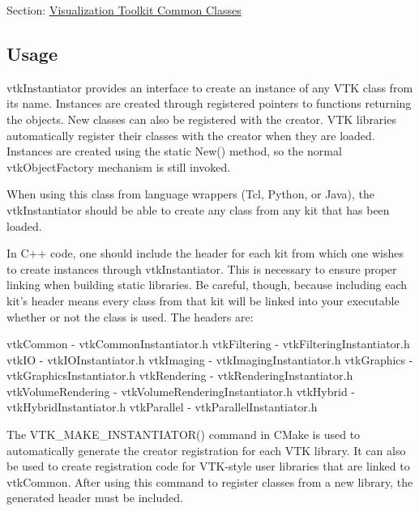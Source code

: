 Section\-: \hyperlink{sec_vtkcommon}{Visualization Toolkit Common Classes} \hypertarget{vtkwidgets_vtkxyplotwidget_Usage}{}\subsection{Usage}\label{vtkwidgets_vtkxyplotwidget_Usage}
vtk\-Instantiator provides an interface to create an instance of any V\-T\-K class from its name. Instances are created through registered pointers to functions returning the objects. New classes can also be registered with the creator. V\-T\-K libraries automatically register their classes with the creator when they are loaded. Instances are created using the static New() method, so the normal vtk\-Object\-Factory mechanism is still invoked.

When using this class from language wrappers (Tcl, Python, or Java), the vtk\-Instantiator should be able to create any class from any kit that has been loaded.

In C++ code, one should include the header for each kit from which one wishes to create instances through vtk\-Instantiator. This is necessary to ensure proper linking when building static libraries. Be careful, though, because including each kit's header means every class from that kit will be linked into your executable whether or not the class is used. The headers are\-:

vtk\-Common -\/ vtk\-Common\-Instantiator.\-h vtk\-Filtering -\/ vtk\-Filtering\-Instantiator.\-h vtk\-I\-O -\/ vtk\-I\-O\-Instantiator.\-h vtk\-Imaging -\/ vtk\-Imaging\-Instantiator.\-h vtk\-Graphics -\/ vtk\-Graphics\-Instantiator.\-h vtk\-Rendering -\/ vtk\-Rendering\-Instantiator.\-h vtk\-Volume\-Rendering -\/ vtk\-Volume\-Rendering\-Instantiator.\-h vtk\-Hybrid -\/ vtk\-Hybrid\-Instantiator.\-h vtk\-Parallel -\/ vtk\-Parallel\-Instantiator.\-h

The V\-T\-K\-\_\-\-M\-A\-K\-E\-\_\-\-I\-N\-S\-T\-A\-N\-T\-I\-A\-T\-O\-R() command in C\-Make is used to automatically generate the creator registration for each V\-T\-K library. It can also be used to create registration code for V\-T\-K-\/style user libraries that are linked to vtk\-Common. After using this command to register classes from a new library, the generated header must be included.

